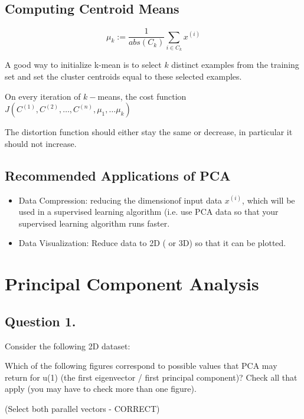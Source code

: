 \subsection{Computing Centroid Means}

\[ 
\mu_k := \frac{1}{abs(C_k)} \sum_{i \in C_k} x^{(i)}
\]

A good way to initialize k-mean is to select $k$ distinct examples from the training set and set the cluster centroids equal to these selected examples.

On every iteration of $k-$means, the cost function $J(C^{(1)},C^{(2)},\ldots, C^{(n)},
\mu_1,\ldots \mu_k)$

The distortion function should either stay the same or decrease, in particular it should not increase.

\subsection{Recommended Applications of PCA}

\begin{itemize}
\item Data Compression: reducing the dimensionof input data $x^{(i)}$, which will be used in a supervised learning algorithm
(i.e. use PCA data so that your supervised learning algorithm runs faster.

\item Data Visualization: Reduce data to 2D ( or 3D) so that it can be plotted.
\end{itemize}

\section{Principal Component Analysis}


\subsection{ Question 1. }

Consider the following 2D dataset:


Which of the following figures correspond to possible values that PCA may return for u(1) (the first eigenvector / first principal component)? 
Check all that apply (you may have to check more than one figure).

(Select both parallel vectors - CORRECT)







